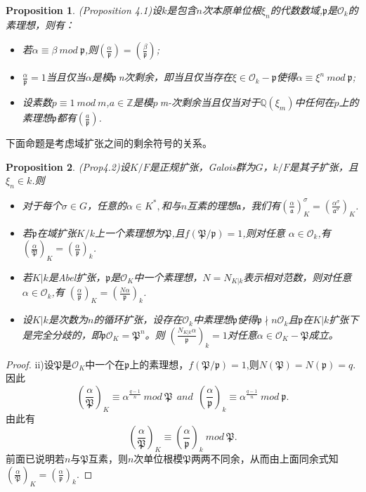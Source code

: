 \documentclass[UTF8]{article}
\newtheorem{prop}{Proposition}[section]
\begin{document}
\begin{prop}
	(\cite{lemmer}Proposition 4.1)设$k$是包含$n$次本原单位根$\xi_{n}$的代数数域,$\mathfrak{p}$是$\mathcal{O}_{k}$的素理想，则有：
	\begin{itemize}
	\item[i)]若$\alpha\equiv\beta\ mod \ \mathfrak{p}$,则$(\frac{\alpha}{\mathfrak{p}})=\left(\frac{\beta}{\mathfrak{p}}\right)$;
  \item[ii)]$\frac{\alpha}{\mathfrak{p}}=1$当且仅当$\alpha$是模$\mathfrak{p}\ $n次剩余，即当且仅当存在$\xi\in \mathcal{O}_{k}-\mathfrak{p}$使得$\alpha\equiv \xi^{n}\ mod \ \mathfrak{p}$;
\item[iii)]设素数$p\equiv 1\ mod \ m$,$a\in\mathbb{Z}$是模$p\ $m-次剩余当且仅当对于$\mathbb{Q}(\xi_{m})$中任何在$p$上的素理想$\mathfrak{p}$都有$(\frac{a}{\mathfrak{p}})$.
\end{itemize}
\end{prop}
下面命题是考虑域扩张之间的剩余符号的关系。
\begin{prop}
	(\cite{lemmer}Prop4.2)设$K/F$是正规扩张，Galois群为$G$，$k/F$是其子扩张，且$\xi_{n}\in k$.则
	\begin{itemize}
		\item[i)] 对于每个$\sigma\in G$，任意的$\alpha\in K^{*},$和与$n$互素的理想$\mathfrak{a}$，我们有$\left(\frac{\alpha}{\mathfrak{a}}\right)^{\sigma}_{K}=\left(\frac{\alpha^{\sigma}}{\mathfrak{a}^{\sigma}}\right)_{K}$.
		\item[ii)]若$\mathfrak{p}$在域扩张$K/k$上一个素理想为$\mathfrak{P}$,且$f(\mathfrak{P}/\mathfrak{p})=1$,则对任意
		$\alpha\in \mathcal{O}_{k}$,有$\left(\frac{\alpha}{\mathfrak{P}}\right)_{K}=\left(\frac{\alpha}{\mathfrak{p}}\right)_{k}$.
		\item[iii)] 若$K|k$是Abel扩张，$\mathfrak{p}$是$\mathcal{O}_{K}$中一个素理想，$N=N_{K|k}$表示相对范数，则对任意$\alpha\in \mathcal{O}_{k}$,有
		$\left(\frac{\alpha}{\mathfrak{p}}\right)_{K}=\left(\frac{N\alpha}{\mathfrak{p}}\right)_{k}$.
		\item[iv)]设$K|k$是次数为$n$的循环扩张，设存在$\mathcal{O}_{k}$中素理想$\mathfrak{p}$使得$\mathfrak{p}\nmid n\mathcal{O}_{k}$且$\mathfrak{p}$在$K|k$扩张下是完全分歧的，即$\mathfrak{p}\mathcal{O}_{K}=\mathfrak{P}^{n}$。则
		$\left(\frac{N_{K|k}\alpha}{\mathfrak{p}}\right)_{k}=1$对任意$\alpha\in \mathcal{O}_{K}-\mathfrak{P}$成立。
	\end{itemize}
	
\end{prop}
\begin{proof}
	ii)设$\mathfrak{P}$是$\mathcal{O}_{K}$中一个在$\mathfrak{p}$上的素理想，$f(\mathfrak{P}/\mathfrak{p})=1$,则$N(\mathfrak{P})=N(\mathfrak{p})=q.$因此
	$$
	\left(\frac{\alpha}{\mathfrak{P}}\right)_{K}\equiv \alpha^{\frac{q-1}{n}}\ mod \ \mathfrak{P}\ \ and \ \ \left(\frac{\alpha}{\mathfrak{p}}\right)_{k}\equiv \alpha^{\frac{q-1}{n}}\ mod \ \mathfrak{p}.
	$$
	由此有$$\left(\frac{\alpha}{\mathfrak{P}}\right)_{K}\equiv \left(\frac{\alpha}{\mathfrak{p}}\right)_{k}\ mod \ \mathfrak{P}.$$
	前面已说明若$n$与$\mathfrak{P}$互素，则$n$次单位根模$\mathfrak{P}$两两不同余，从而由上面同余式知$\left(\frac{\alpha}{\mathfrak{P}}\right)_{K}= \left(\frac{\alpha}{\mathfrak{p}}\right)_{k}$.
\end{proof}
\end{document}
